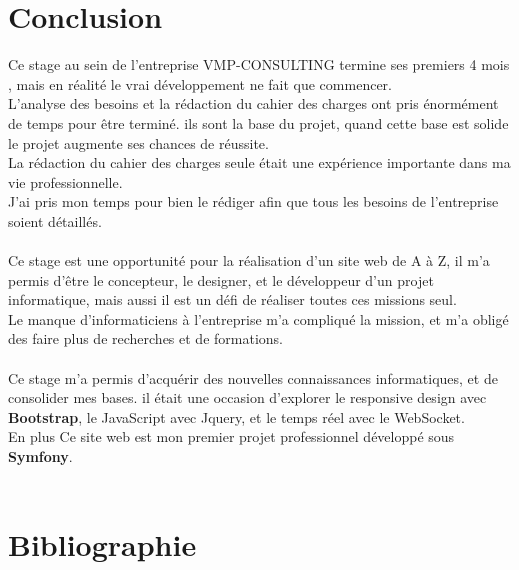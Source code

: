 \documentclass[12pt]{article}
\begin{document}
 


\newpage
\section{Conclusion}

Ce stage au sein de l'entreprise VMP-CONSULTING termine ses premiers 4 mois , mais en réalité le vrai développement ne fait que commencer.\\

L'analyse des besoins et la rédaction du cahier des charges ont pris énormément de temps   pour être terminé. ils sont la base du projet, quand cette base est solide le projet augmente ses chances de réussite. \\
La rédaction du cahier des charges seule était une expérience importante dans ma vie professionnelle.\\ 
J'ai pris mon temps pour bien le rédiger  afin que tous les besoins de l'entreprise soient détaillés.
  \\ \\

Ce stage est une opportunité pour la réalisation d'un site web de A à Z, il m'a permis d’être le concepteur, le designer, et le développeur d'un projet informatique, mais aussi il est un défi de réaliser toutes ces missions seul. \\ Le manque d'informaticiens à l'entreprise  m'a compliqué la mission, et  m'a obligé des faire plus de recherches et de formations.\\ \\

Ce stage m'a permis d’acquérir des nouvelles connaissances informatiques, et de consolider mes bases. il était une occasion d'explorer le responsive design avec \textbf{Bootstrap}, le JavaScript avec Jquery, et le temps réel avec le WebSocket.\\
En plus Ce site web est  mon premier projet professionnel développé sous \textbf{Symfony}.\\
\\







\newpage
\section{Bibliographie}
\end{document}
